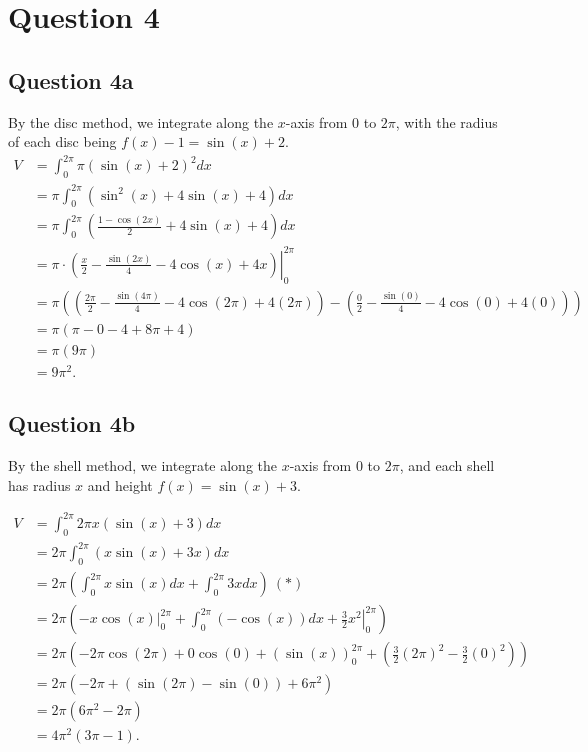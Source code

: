 \documentclass[12pt]{article}
\begin{document}
\newpage
\section*{Question 4}
\subsection*{Question 4a}
By the disc method, we integrate along the $x$-axis from $0$ to $2\pi$, with the radius of each disc being $f(x)-1=\sin(x)+2$.
\begin{align*}
    V &= \int_0^{2\pi}\pi(\sin(x) + 2)^2dx\\
    &= \pi\int_0^{2\pi}\left(\sin^2(x)+4\sin(x) +4\right)dx\\
    &= \pi\int_0^{2\pi}\left(\frac{1-\cos(2x)}{2}+4\sin(x) +4\right)dx\\
    &= \pi\cdot\left.\left(\frac{x}{2}-\frac{\sin(2x)}{4}-4\cos(x)+4x\right)\right|_0^{2\pi}\\
    &=\pi\left(\left(\frac{2\pi}{2}-\frac{\sin(4\pi)}{4}-4\cos(2\pi)+4(2\pi)\right)-\left(\frac{0}{2}-\frac{\sin(0)}{4}-4\cos(0)+4(0)\right)\right)\\
    &= \pi (\pi - 0 - 4 + 8\pi + 4)\\
    &= \pi (9\pi)\\
    &= 9\pi^2.
\end{align*}

\subsection*{Question 4b}
By the shell method, we integrate along the $x$-axis from $0$ to $2\pi$, and each shell has radius $x$ and height $f(x)=\sin(x)+3$.

\begin{align*}
    V &= \int_0^{2\pi} 2\pi x (\sin(x)+3) dx\\
    &= 2\pi \int_0^{2\pi}\left( x\sin(x) + 3x\right)dx\\
    &= 2\pi \left(\int_0^{2\pi}x\sin(x)dx + \int_0^{2\pi}3xdx\right)\:(*)\\
    &= 2\pi \left(\left.-x\cos(x)\right|_0^{2\pi}+\int_0^{2\pi}\left(-\cos(x)\right)dx + \left.\frac{3}{2}x^2\right|_0^{2\pi}\right)\\
    &= 2\pi\left(-2\pi\cos(2\pi)+0\cos(0)+(\sin(x))_0^{2\pi}+\left(\frac{3}{2}(2\pi)^2-\frac{3}{2}(0)^2\right)\right)\\
    &= 2\pi\left(-2\pi + (\sin(2\pi)-\sin(0))+6\pi^2\right)\\
    &=2\pi(6\pi^2-2\pi)\\
    &= 4\pi^2(3\pi-1).
\end{align*}
\end{document}
